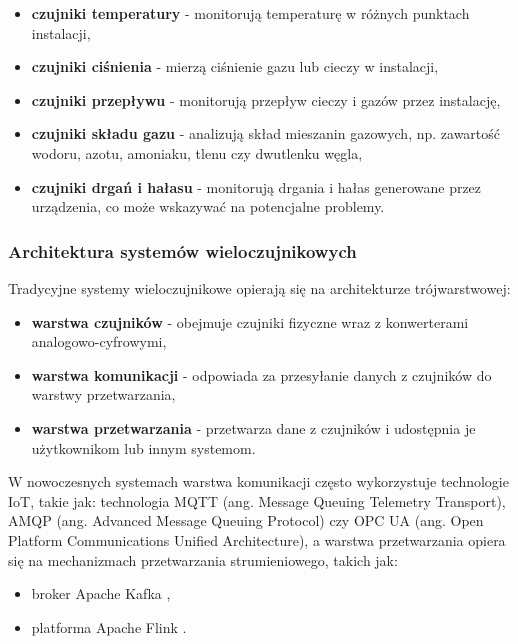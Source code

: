 \begin{itemize}
    \item \textbf{czujniki temperatury} - monitorują temperaturę w różnych punktach instalacji,
    \item \textbf{czujniki ciśnienia} - mierzą ciśnienie gazu lub cieczy w instalacji,
    \item \textbf{czujniki przepływu} - monitorują przepływ cieczy i gazów przez instalację,
    \item \textbf{czujniki składu gazu} - analizują skład mieszanin gazowych, np. zawartość wodoru, azotu, amoniaku, tlenu czy dwutlenku węgla,
    \item \textbf{czujniki drgań i hałasu} - monitorują drgania i hałas generowane przez urządzenia, co może wskazywać na potencjalne problemy.
\end{itemize}

\newpage

\subsubsection{Architektura systemów wieloczujnikowych}
\label{subsubsec:architektura_systemow}

Tradycyjne systemy wieloczujnikowe opierają się na architekturze trójwarstwowej:

\begin{itemize}
    \item \textbf{warstwa czujników} - obejmuje czujniki fizyczne wraz z konwerterami analogowo-cyfrowymi,
    \item \textbf{warstwa komunikacji} - odpowiada za przesyłanie danych z czujników do warstwy przetwarzania,
    \item \textbf{warstwa przetwarzania} - przetwarza dane z czujników i udostępnia je użytkownikom lub innym systemom.
\end{itemize}

W nowoczesnych systemach warstwa komunikacji często wykorzystuje technologie IoT, takie jak: technologia MQTT (ang. Message Queuing Telemetry Transport), AMQP (ang. Advanced Message Queuing Protocol) czy OPC UA (ang. Open Platform Communications Unified Architecture),
a warstwa przetwarzania opiera się na mechanizmach przetwarzania strumieniowego, takich jak:

\begin{itemize}
    \item broker Apache Kafka \cite{spark_documentation},
    \item platforma Apache Flink \cite{flink}.
\end{itemize}

